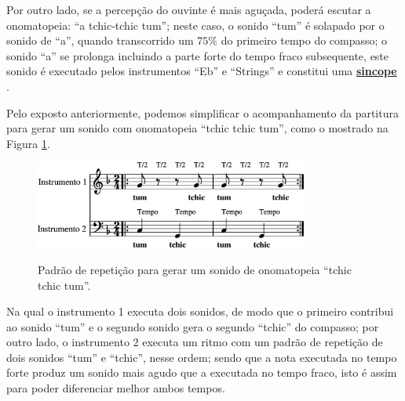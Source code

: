 Por outro lado, se a percepção do ouvinte é mais
aguçada, poderá escutar a onomatopeia: ``a tchic-tchic tum''; 
neste caso, o sonido ``tum'' é solapado por o sonido de ``a'',
quando transcorrido um $75\%$ do primeiro tempo do compasso; 
o sonido ``a''  se prolonga incluindo a parte forte do tempo fraco subsequente, 
este sonido é executado pelos instrumentos ``Eb'' e ``Strings'' e constitui uma 
\hyperref[sec:sincope]{\textbf{sincope}} \cite[pp. 143]{medteoria}.


Pelo exposto anteriormente, 
podemos simplificar o acompanhamento da partitura para gerar um sonido com onomatopeia
``tchic tchic tum'', como o mostrado na Figura \ref{fig:abc-tchic-tchic-tum-1}.
\begin{figure}[ht]
\centering
\href{https://drive.google.com/file/d/1vaQ0ZC7SaRYCYSit8waHzl0-5NQC23BT/view?usp=sharing}{\includegraphics[width=0.8\textwidth]{chapters/cap-musicalidade-percepcion/abc-tchic-tchic-tum-1.eps}}

\caption{Padrão de repetição para gerar um sonido de onomatopeia ``tchic tchic tum''.}
\label{fig:abc-tchic-tchic-tum-1}
\end{figure}
Na qual o instrumento 1 executa dois sonidos, de modo que o primeiro contribui ao sonido 
``tum'' e o segundo sonido gera o segundo ``tchic'' do compasso; por outro lado,
o instrumento 2 executa um ritmo com um padrão
de repetição de dois sonidos ``tum'' e ``tchic'', nesse ordem;
sendo que a nota executada no tempo forte produz um sonido mais agudo que a 
executada no tempo fraco, isto é assim para poder diferenciar melhor ambos tempos.

